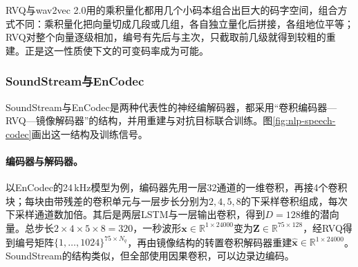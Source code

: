 RVQ与wav2vec 2.0用的乘积量化都用几个小码本组合出巨大的码字空间，组合方式不同：乘积量化把向量切成几段或几组，各自独立量化后拼接，各组地位平等；RVQ对整个向量逐级相加，编号有先后与主次，只截取前几级就得到较粗的重建。正是这一性质使下文的可变码率成为可能。

\subsubsection{SoundStream与EnCodec}
\label{sec:nlp-speech-soundstream}

SoundStream与EnCodec是两种代表性的神经编解码器，都采用“卷积编码器—RVQ—镜像解码器”的结构，并用重建与对抗目标联合训练\cite{nlp-speech-zeghidour2022soundstream,nlp-speech-defossez2023encodec}。图\ref{fig:nlp-speech-codec}画出这一结构及训练信号。

\paragraph{编码器与解码器。}以EnCodec的24\,kHz模型为例，编码器先用一层32通道的一维卷积，再接4个卷积块；每块由带残差的卷积单元与一层步长分别为$2,4,5,8$的下采样卷积组成，每次下采样通道数加倍。其后是两层LSTM与一层输出卷积，得到$D=128$维的潜向量。总步长$2\times4\times5\times8=320$，一秒波形$\bm x\in\mathbb R^{1\times24000}$变为$\bm Z\in\mathbb R^{75\times128}$，经RVQ得到编号矩阵$\{1,\ldots,1024\}^{75\times N_q}$，再由镜像结构的转置卷积解码器重建$\hat{\bm x}\in\mathbb R^{1\times24000}$。SoundStream的结构类似，但全部使用因果卷积，可以边录边编码。

